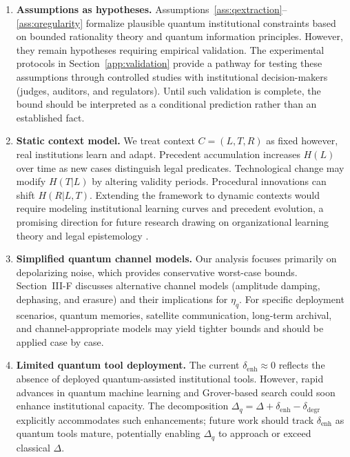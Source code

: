 \documentclass{ieeeaccess}
\begin{document}
\begin{enumerate}
    \item \textbf{Assumptions as hypotheses.} Assumptions~\ref{ass:qextraction}--\ref{ass:qregularity} 
    formalize plausible quantum institutional constraints based on bounded rationality 
    theory and quantum information principles. However, they remain hypotheses requiring 
    empirical validation. The experimental protocols in Section~\ref{app:validation} 
    provide a pathway for testing these assumptions through controlled studies with 
    institutional decision-makers (judges, auditors, and regulators). Until such validation 
    is complete, the bound should be interpreted as a conditional prediction rather 
    than an established fact.

    \item \textbf{Static context model.} We treat context $C = (L, T, R)$ as fixed
     however,  real institutions learn and adapt. Precedent accumulation increases $H(L)$ 
    over time as new cases distinguish legal predicates. Technological change may 
    modify $H(T|L)$ by altering validity periods. Procedural innovations can shift 
    $H(R|L,T)$. Extending the framework to dynamic contexts would require modeling 
    institutional learning curves and precedent evolution, a promising direction for 
    future research drawing on organizational learning theory \cite{Argyris1978} and 
    legal epistemology \cite{Twining1999}.

    \item \textbf{Simplified quantum channel models.} Our analysis focuses primarily 
    on depolarizing noise, which provides conservative worst-case bounds. Section~III-F 
    discusses alternative channel models (amplitude damping, dephasing,  and erasure) and 
    their implications for $\eta_q$. For specific deployment scenarios, quantum memories, 
    satellite communication, long-term archival, and channel-appropriate models may yield 
    tighter bounds and should be applied case by case.

    \item \textbf{Limited quantum tool deployment.} The current $\delta_{\text{enh}} \approx 0$ 
    reflects the absence of deployed quantum-assisted institutional tools. However, 
    rapid advances in quantum machine learning and Grover-based search could soon 
    enhance institutional capacity. The decomposition $\Delta_q = \Delta + \delta_{\text{enh}} - \delta_{\text{degr}}$ 
    explicitly accommodates such enhancements; future work should track $\delta_{\text{enh}}$ 
    as quantum tools mature, potentially enabling $\Delta_q$ to approach or exceed 
    classical $\Delta$.
\end{enumerate}
\end{document}
